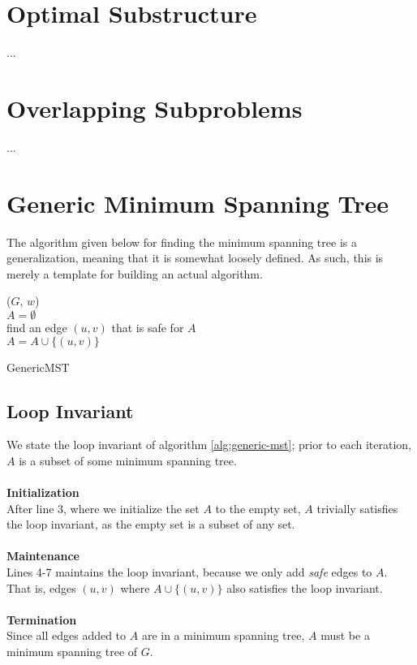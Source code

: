 \section{Optimal Substructure}
...

\section{Overlapping Subproblems}
...

\newpage
\section{Generic Minimum Spanning Tree}
The algorithm given below for finding the minimum spanning tree is a
generalization, meaning that it is somewhat loosely defined. As such, this
is merely a template for building an actual algorithm.
\begin{algorithm}
	
	
	
	\BlankLine
	
	\GenericMST($G$, $w$) \\
	\Begin
	{
		$A = \emptyset$ \\
		{
			find an edge $(u, v)$ that is safe for $A$ \\
			$A = A \cup \{(u, v)\}$
		}
	}
	
	\caption{GenericMST}
	\label{alg:generic-mst}
\end{algorithm}
\subsection{Loop Invariant}
We state the loop invariant of algorithm \ref{alg:generic-mst}; prior to each
iteration, $A$ is a subset of some minimum spanning tree.
\\\\
\noindent \textbf{Initialization} \\
After line 3, where we initialize the set $A$ to the empty set, $A$ trivially
satisfies the loop invariant, as the empty set is a subset of any set.
\\\\
\noindent \textbf{Maintenance} \\
Lines 4-7 maintains the loop invariant, because we only add \textit{safe}
edges to $A$. That is, edges $(u, v)$ where $A \cup \{(u, v)\}$ also
satisfies the loop invariant.
\\\\
\noindent \textbf{Termination} \\
Since all edges added to $A$ are in a minimum spanning tree, $A$ must be a
minimum spanning tree of $G$.

